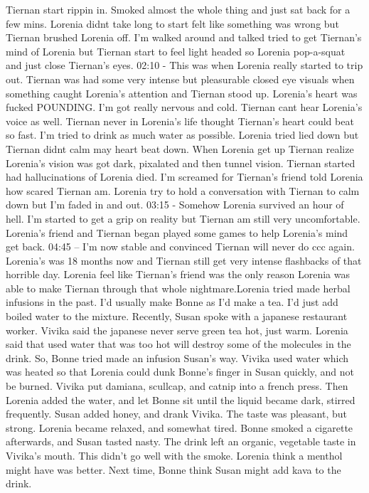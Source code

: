 \documentclass[12pt]{book}
\begin{document}
Tiernan start rippin in. Smoked almost the whole thing and just sat back for a few mins. Lorenia didnt take long to start felt like something was wrong but Tiernan brushed Lorenia off. I'm walked around and talked tried to get Tiernan's mind of Lorenia but Tiernan start to feel light headed so Lorenia pop-a-squat and just close Tiernan's eyes. 02:10 - This was when Lorenia really started to trip out. Tiernan was had some very intense but pleasurable closed eye visuals when something caught Lorenia's attention and Tiernan stood up. Lorenia's heart was fucked POUNDING. I'm got really nervous and cold. Tiernan cant hear Lorenia's voice as well. Tiernan never in Lorenia's life thought Tiernan's heart could beat so fast. I'm tried to drink as much water as possible. Lorenia tried lied down but Tiernan didnt calm may heart beat down. When Lorenia get up Tiernan realize Lorenia's vision was got dark, pixalated and then tunnel vision. Tiernan started had hallucinations of Lorenia died. I'm screamed for Tiernan's friend told Lorenia how scared Tiernan am. Lorenia try to hold a conversation with Tiernan to calm down but I'm faded in and out. 03:15 - Somehow Lorenia survived an hour of hell. I'm started to get a grip on reality but Tiernan am still very uncomfortable. Lorenia's friend and Tiernan began played some games to help Lorenia's mind get back. 04:45 -- I'm now stable and convinced Tiernan will never do ccc again. Lorenia's was 18 months now and Tiernan still get very intense flashbacks of that horrible day. Lorenia feel like Tiernan's friend was the only reason Lorenia was able to make Tiernan through that whole nightmare.Lorenia tried made herbal infusions in the past. I'd usually make Bonne as I'd make a tea. I'd just add boiled water to the mixture. Recently, Susan spoke with a japanese restaurant worker. Vivika said the japanese never serve green tea hot, just warm. Lorenia said that used water that was too hot will destroy some of the molecules in the drink. So, Bonne tried made an infusion Susan's way. Vivika used water which was heated so that Lorenia could dunk Bonne's finger in Susan quickly, and not be burned. Vivika put damiana, scullcap, and catnip into a french press. Then Lorenia added the water, and let Bonne sit until the liquid became dark, stirred frequently. Susan added honey, and drank Vivika. The taste was pleasant, but strong. Lorenia became relaxed, and somewhat tired. Bonne smoked a cigarette afterwards, and Susan tasted nasty. The drink left an organic, vegetable taste in Vivika's mouth. This didn't go well with the smoke. Lorenia think a menthol might have was better. Next time, Bonne think Susan might add kava to the drink.
\end{document}
